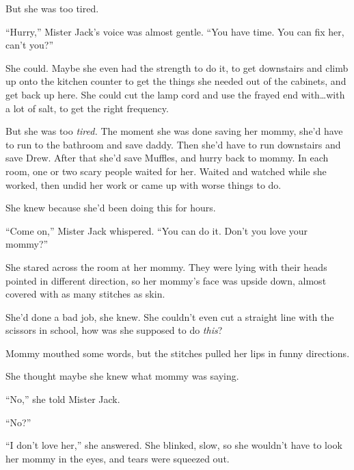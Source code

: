 But she was too tired.



``Hurry,'' Mister Jack's voice was almost gentle.  ``You have time.  You can fix her, can't you?''



She could.  Maybe she even had the strength to do it, to get downstairs and climb up onto the kitchen counter to get the things she needed out of the cabinets, and get back up here.  She could cut the lamp cord and use the frayed end with\ldots with a lot of salt, to get the right frequency.



But she was too \emph{tired.  }The moment she was done saving her mommy, she'd have to run to the bathroom and save daddy.  Then she'd have to run downstairs and save Drew.  After that she'd save Muffles, and hurry back to mommy.  In each room, one or two scary people waited for her.  Waited and watched while she worked, then undid her work or came up with worse things to do.



She knew because she'd been doing this for hours.



``Come on,'' Mister Jack whispered.  ``You can do it.  Don't you love your mommy?''



She stared across the room at her mommy.  They were lying with their heads pointed in different direction, so her mommy's face was upside down, almost covered with as many stitches as skin.



She'd done a bad job, she knew.  She couldn't even cut a straight line with the scissors in school, how was she supposed to do \emph{this}?



Mommy mouthed some words, but the stitches pulled her lips in funny directions.



She thought maybe she knew what mommy was saying.



``No,'' she told Mister Jack.



``No?''



``I don't love her,'' she answered.  She blinked, slow, so she wouldn't have to look her mommy in the eyes, and tears were squeezed out.



